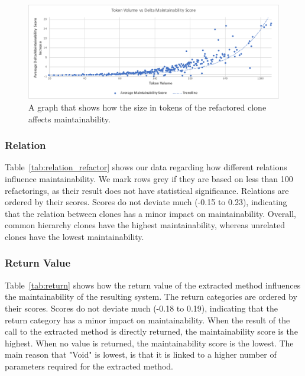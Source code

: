 \documentclass[sigconf,review,anonymous]{acmart}
\begin{document}
\begin{figure}
  \includegraphics[width=1\textwidth]{img/tokenvolume}
  \caption{A graph that shows how the size in tokens of the refactored clone affects maintainability.}
  \label{fig:maintainabilityscore}
\end{figure}

\subsubsection{Relation}
Table~\ref{tab:relation_refactor} shows our data regarding how different relations influence maintainability. We mark rows grey if they are based on less than 100 refactorings, as their result does not have statistical significance. Relations are ordered by their scores. %
Scores do not deviate much (-0.15 to 0.23), indicating that the relation between clones has a minor impact on maintainability. Overall, common hierarchy clones have the highest maintainability, whereas unrelated clones have the lowest maintainability.

\subsubsection{Return Value}
Table~\ref{tab:return} shows how the return value of the extracted method influences the maintainability of the resulting system. The return categories are ordered by their scores. %
Scores do not deviate much (-0.18 to 0.19), indicating that the return category has a minor impact on maintainability. When the result of the call to the extracted method is directly returned, the maintainability score is the highest. When no value is returned, the maintainability score is the lowest. %
The main reason that "Void" is lowest, is that it is linked to a higher number of parameters required for the extracted method.
\end{document}
